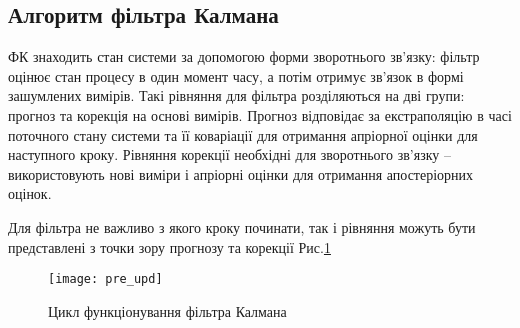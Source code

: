 \subsection{Алгоритм фільтра Калмана}

ФК знаходить стан системи за допомогою форми зворотнього зв'язку: фільтр
оцінює стан процесу в один момент часу, а потім отримує зв'язок в формі
зашумлених вимірів. Такі рівняння для фільтра розділяються на дві групи: 
прогноз та корекція на основі вимірів. Прогноз відповідає за екстраполяцію
в часі поточного стану системи та її коваріації для отримання апріорної
оцінки для наступного кроку. Рівняння корекції необхідні для зворотнього
зв'язку -- використовують нові виміри і апріорні оцінки для отримання 
апостеріорних оцінок.

Для фільтра не важливо з якого кроку починати, так і рівняння можуть бути 
представлені з точки зору прогнозу та корекції Рис.\ref{fig:basic_cycle}
\begin{figure}[here]
\centering
\texttt{[image: pre\_upd]}
\caption{Цикл функціонування фільтра Калмана }
\label{fig:basic_cycle}
\end{figure} 



